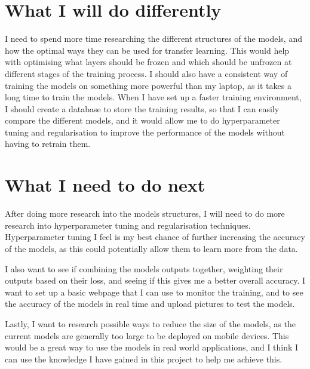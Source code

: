 \documentclass[]{final_report}
\begin{document}
\section{What I will do differently}
I need to spend more time researching the different structures of the models, and how the optimal ways they can be used for transfer learning.
This would help with optimising what layers should be frozen and which should be unfrozen at different stages of the training process.
I should also have a consistent way of training the models on something more powerful than my laptop, as it takes a long time to train the models.
When I have set up a faster training environment, I should create a database to store the training results, so that I can easily compare the different models,
and it would allow me to do hyperparameter tuning and regularisation to improve the performance of the models without having to retrain them.

\section{What I need to do next}
After doing more research into the models structures, I will need to do more research into hyperparameter tuning and regularisation techniques.
Hyperparameter tuning I feel is my best chance of further increasing the accuracy of the models, as this could potentially allow them to learn more from the data.

I also want to see if combining the models outputs together, weighting their outputs based on their loss, and seeing if this gives me a better overall accuracy.
I want to set up a basic webpage that I can use to monitor the training, and to see the accuracy of the models in real time and upload pictures to test the models.

Lastly, I want to research possible ways to reduce the size of the models, as the current models are generally too large to be deployed on mobile devices.
This would be a great way to use the models in real world applications,
and I think I can use the knowledge I have gained in this project to help me achieve this.

\newpage
\printbibliography
\label{endpage}
\end{document}
